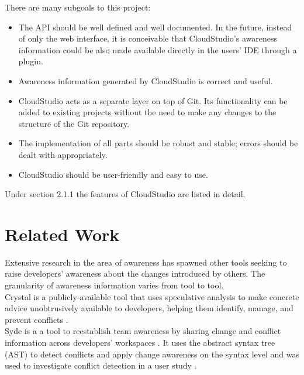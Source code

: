 There are many subgoals to this project:

\begin{itemize}

\item The API should be well defined and well documented. In the future, instead of only the web interface, it is conceivable that CloudStudio's awareness information could be also made available directly in the users' IDE through a plugin.
\item Awareness information generated by CloudStudio is correct and useful.
\item CloudStudio acts as a separate layer on top of Git. Its functionality can be added to existing projects without the need to make any changes to the structure of the Git repository.
\item The implementation of all parts should be robust and stable; errors should be dealt with appropriately.
\item CloudStudio should be user-friendly and easy to use.

\end{itemize}

Under section 2.1.1 the features of CloudStudio are listed in detail.







\section{Related Work}




Extensive research in the area of awareness has spawned other tools seeking to raise developers' awareness about the changes introduced by others. The granularity of awareness information varies from tool to tool. \\

Crystal is a publicly-available tool that uses speculative analysis to make concrete advice unobtrusively available to developers, helping them identify, manage, and prevent conflicts \cite{ref25}. \\

Syde is a a tool to reestablish team awareness by sharing change and conflict information across developers' workspaces \cite{ref23}. It uses the abstract syntax tree (AST) to detect conflicts and apply change awareness on the syntax level and was used to investigate conflict detection in a user study \cite{ref24}. \\

